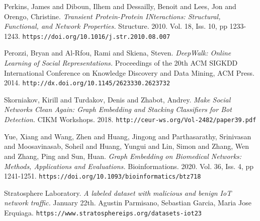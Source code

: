 \documentclass[10pt]{article}
\begin{document}
\begin{multicols}{2}
\begin{thebibliography}{5}
Perkins, James and Diboun, Ilhem and Dessailly, Benoit and Lees, Jon and Orengo, Christine.
\textit{Transient Protein-Protein INteractions: Structural, Functional, and Network Properties.}
Structure. 2010. Vol. 18, Iss. 10, pp 1233-1243.
\texttt{https://doi.org/10.1016/j.str.2010.08.007}

Perozzi, Bryan and Al-Rfou, Rami and Skiena, Steven.
\textit{DeepWalk: Online Learning of Social Representations.}
Proceedings of the 20th ACM SIGKDD International Conference on Knowledge Discovery and Data Mining, ACM Press. 2014.
\texttt{http://dx.doi.org/10.1145/2623330.2623732}

Skorniakov, Kirill and Turdakov, Denis and Zhabot, Andrey.
\textit{Make Social Networks Clean Again: Graph Embedding and Stacking Classifiers for Bot Detection.}
CIKM Workshops. 2018.
\texttt{http://ceur-ws.org/Vol-2482/paper39.pdf}

Yue, Xiang and Wang, Zhen and Huang, Jingong and Parthasarathy, Srinivasan and Moosavinasab, Soheil and Huang, Yungui and Lin, Simon and Zhang, Wen and Zhang, Ping and Sun, Huan.
\textit{Graph Embedding on Biomedical Networks: Methods, Applications and Evaluations.}
Bioinformations. 2020. Vol. 36, Iss. 4, pp 1241-1251.
\texttt{https://doi.org/10.1093/bioinformatics/btz718}

Stratosphere Laboratory.
\textit{A labeled dataset with malicious and benign IoT network traffic.}
January 22th. Agustin Parmisano, Sebastian Garcia, Maria Jose Erquiaga.
\texttt{https://www.stratosphereips.org/datasets-iot23}

\end{thebibliography}

\end{multicols}
\end{document}
